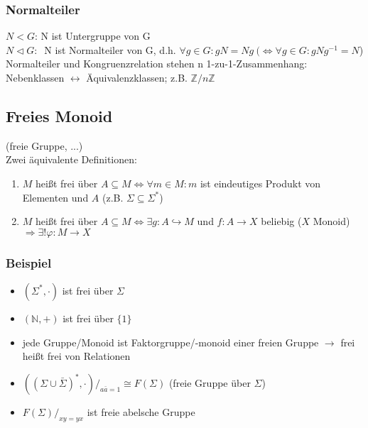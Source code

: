         \subsubsection{Normalteiler}
            $N<G$: N ist Untergruppe von G\\
            $N\triangleleft G:\ $
            N ist Normalteiler von G, d.h. $\forall g\in G : gN=Ng\ (\Leftrightarrow \forall g\in G : gNg^{-1}=N$)\\
            Normalteiler und Kongruenzrelation stehen n 1-zu-1-Zusammenhang: Nebenklassen $\leftrightarrow$ Äquivalenzklassen; z.B. $\mathds{Z}/n\mathds{Z}$
    \subsection{Freies Monoid}
        (freie Gruppe, ...)\\
        Zwei äquivalente Definitionen:
        \begin{enumerate}
            \item $M$ heißt frei über $A\subseteq M\Leftrightarrow \forall m\in M: m$ ist eindeutiges Produkt von Elementen und $A$ (z.B. $\Sigma\subseteq\Sigma^*$)
            \item $M$ heißt frei über $A\subseteq M\Leftrightarrow \exists g:A\hookrightarrow M$ und $f:A\rightarrow X$ beliebig ($X$ Monoid) $\Rightarrow \exists!\varphi:M\rightarrow X$
        \end{enumerate}
        \subsubsection{Beispiel}
            \begin{itemize}
                \item $(\Sigma^*,\cdot)$ ist frei über $\Sigma$
                \item $(\mathds{N},+)$ ist frei über $\{1\}$
                \item jede Gruppe/Monoid ist Faktorgruppe/-monoid einer freien Gruppe $\rightarrow$ frei heißt frei von Relationen
                \item $\left(\left(\Sigma\cup\bar{\Sigma}\right)^*,\cdot \right)/_{a\bar{a}=1}\cong F(\Sigma)$ (freie Gruppe über $\Sigma$)
                \item $F(\Sigma)/_{xy=yx}$ ist freie abelsche Gruppe
            \end{itemize}
